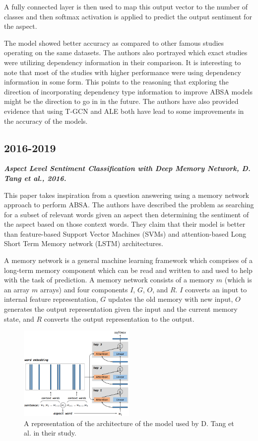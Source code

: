 \documentclass[conference]{IEEEtran}
\begin{document}
A fully connected layer is then used to map this output vector to the number of classes and then softmax activation is applied to predict the output sentiment for the aspect.

The model showed better accuracy as compared to other famous studies operating on the same datasets. The authors also portrayed which exact studies were utilizing dependency information in their comparison. It is interesting to note that most of the studies with higher performance were using dependency information in some form. This points to the reasoning that exploring the direction of incorporating dependency type information to improve ABSA models might be the direction to go in in the future. The authors have also provided evidence that using T-GCN and ALE both have lead to some improvements in the accuracy of the models.\\

\subsection{2016-2019}

\textit{\textbf{Aspect Level Sentiment Classification with Deep Memory Network, D. Tang et al., 2016.}}

This paper takes inspiration from a question answering using a memory network approach to perform ABSA. The authors have described the problem as searching for a subset of relevant words given an aspect then determining the sentiment of the aspect based on those context words. They claim that their model is better than feature-based Support Vector Machines (SVMs) and attention-based Long Short Term Memory network (LSTM) architectures.

A memory network is a general machine learning framework which comprises of a long-term memory component which can be read and written to and used to help with the task of prediction. A memory network consists of a memory $m$ (which is an array $m$ arrays) and four components $I$, $G$, $O$, and $R$. $I$ converts an input to internal feature representation, $G$ updates the old memory with new input, $O$ generates the output representation given the input and the current memory state, and $R$ converts the output representation to the output.

\begin{figure}[htbp]
\centerline{\includegraphics[keepaspectratio, width=0.5\textwidth]{pics/6.png}}
\caption{A representation of the architecture of the model used by D. Tang et al. in their study.}
\label{fig}
\end{figure}
\end{document}
